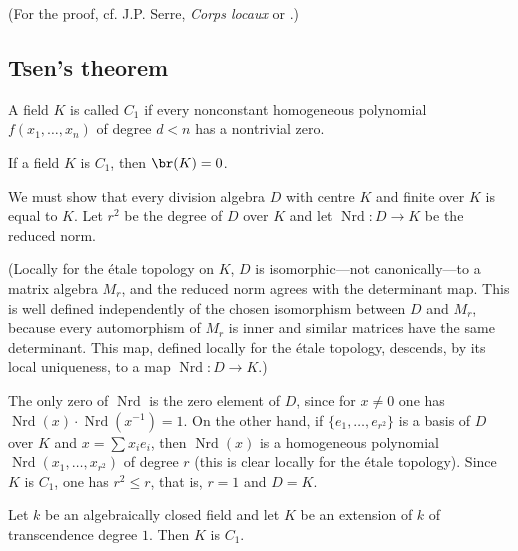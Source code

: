 (For the proof, cf. J.P. Serre, \emph{Corps locaux} or .)

\subsection{Tsen's theorem}\label{I:3-2}

\begin{definition}\label{I:3-2-1}
A field $K$ is called $C_1$ if every nonconstant homogeneous polynomial
$f(x_1,\dotsc,x_n)$ of degree $d<n$ has a nontrivial zero.
\end{definition}

\begin{proposition}\label{I:3-2-2}
If a field $K$ is $C_1$, then $\br(K)=0$.
\end{proposition}

We must show that every division algebra $D$ with centre $K$ and finite
over $K$ is equal to $K$. Let $r^2$ be the degree of $D$ over $K$ and
let $\operatorname{Nrd}:D\to K$ be the reduced norm.

(Locally for the étale topology on $K$, $D$ is isomorphic---not
canonically---to a matrix algebra $M_r$, and the reduced norm agrees with
the determinant map. This is well defined independently of the chosen
isomorphism between $D$ and $M_r$, because every automorphism of $M_r$
is inner and similar matrices have the same determinant. This map, defined
locally for the étale topology, descends, by its local uniqueness, to a map
$\operatorname{Nrd}:D\to K$.)

The only zero of $\operatorname{Nrd}$ is the zero element of $D$, since
for $x\ne0$ one has
$\operatorname{Nrd}(x)\cdot\operatorname{Nrd}(x^{-1})=1$. On the other
hand, if $\{e_1,\dotsc,e_{r^2}\}$ is a basis of $D$ over $K$ and
$x=\sum x_ie_i$, then $\operatorname{Nrd}(x)$ is a homogeneous
polynomial $\operatorname{Nrd}(x_1,\dotsc,x_{r^2})$ of degree $r$
(this is clear locally for the étale topology). Since $K$ is $C_1$, one
has $r^2\leqslant r$, that is, $r=1$ and $D=K$.

\begin{theorem}[Tsen]\label{I:3-2-3}
Let $k$ be an algebraically closed field and let $K$ be an extension of
$k$ of transcendence degree $1$. Then $K$ is $C_1$.
\end{theorem}

